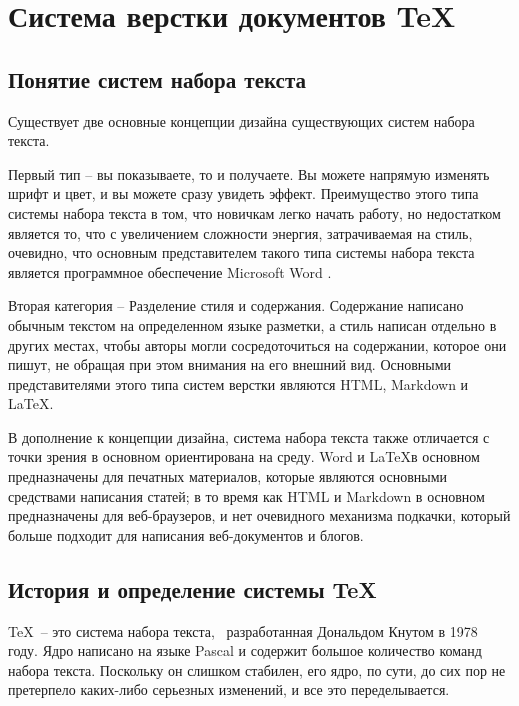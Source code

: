 
\chapter{Система верстки документов \TeX}

\section{Понятие систем набора текста}
Существует две основные концепции дизайна существующих систем набора текста. 

Первый тип --  вы показываете, то и получаете\guillemotright. Вы можете напрямую изменять шрифт и цвет, и вы можете сразу увидеть эффект. Преимущество этого типа системы набора текста в том, что новичкам легко начать работу, но недостатком является то, что с увеличением сложности энергия, затрачиваемая на стиль, очевидно, что основным представителем такого типа системы набора текста является программное обеспечение Microsoft Word \cite{18}. 

Вторая категория -- \guillemotleft Разделение стиля и содержания\guillemotright. Содержание написано обычным текстом на определенном \guillemotleft языке разметки\guillemotright, а стиль написан отдельно в других местах, чтобы авторы могли сосредоточиться на содержании, которое они пишут, не обращая при этом внимания на его внешний вид. Основными представителями этого типа систем верстки являются HTML, Markdown и \LaTeX \cite{19}.

В дополнение к концепции дизайна, система набора текста также отличается с точки зрения \guillemotleft в основном ориентирована на среду\guillemotright. Word и \LaTeX в основном предназначены для печатных материалов, которые являются основными средствами написания статей; в то время как HTML и Markdown в основном предназначены для веб-браузеров, и нет очевидного механизма подкачки, который больше подходит для написания веб-документов и блогов.



\section{История и определение системы \TeX}

\TeX \ -- это система набора текста,  \ разработанная Дональдом Кнутом в 1978 году. Ядро написано на языке Pascal и содержит большое количество команд набора текста. Поскольку он слишком стабилен, его ядро, по сути, до сих пор не претерпело каких-либо серьезных изменений, и все это переделывается.

